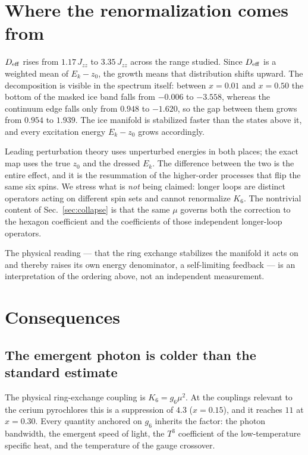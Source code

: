 \documentclass[aps,prb,preprint,amsmath,amssymb,superscriptaddress,
longbibliography,floatfix]{revtex4-2}
\newcommand{\Jzz}{J_{zz}}
\newcommand{\Deff}{D_{\rm eff}}
\begin{document}
\section{Where the renormalization comes from}
\label{sec:origin}

$\Deff$ rises from $1.17\,\Jzz$ to $3.35\,\Jzz$ across the range studied.  Since
$\Deff$ is a weighted mean of $E_k-z_0$, the growth means that distribution
shifts upward.  The decomposition is visible in the spectrum itself: between
$x=0.01$ and $x=0.50$ the bottom of the masked ice band falls from $-0.006$ to
$-3.558$, whereas the continuum edge falls only from $0.948$ to $-1.620$, so
the gap between them grows from $0.954$ to $1.939$.  The ice manifold is
stabilized faster than the states above it, and every excitation energy
$E_k-z_0$ grows accordingly.

Leading perturbation theory uses unperturbed energies in both places; the exact
map uses the true $z_0$ and the dressed $E_k$.  The difference between the two
is the entire effect, and it is the resummation of the higher-order processes
that flip the same six spins.  We stress what is \emph{not} being claimed:
longer loops are distinct operators acting on different spin sets and cannot
renormalize $K_6$.  The nontrivial content of Sec.~\ref{sec:collapse} is that
the same $\mu$ governs both the correction to the hexagon coefficient and the
coefficients of those independent longer-loop operators.

The physical reading --- that the ring exchange stabilizes the manifold it acts
on and thereby raises its own energy denominator, a self-limiting feedback ---
is an interpretation of the ordering above, not an independent measurement.

\section{Consequences}
\label{sec:consequences}

\subsection{The emergent photon is colder than the standard estimate}

The physical ring-exchange coupling is $K_6=g_6\mu^2$.  At the couplings
relevant to the cerium pyrochlores this is a suppression of $4.3$
($x=0.15$), and it reaches $11$ at $x=0.30$.  Every quantity anchored on $g_6$
inherits the factor: the photon bandwidth, the emergent speed of light, the
$T^3$ coefficient of the low-temperature specific heat, and the temperature of
the gauge crossover.
\end{document}
